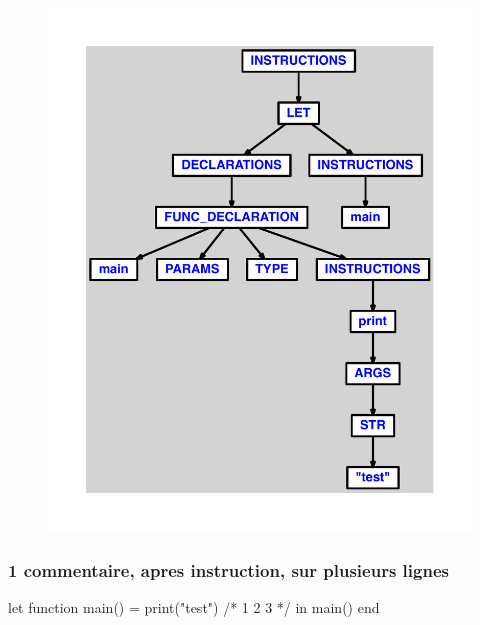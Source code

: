 \documentclass{article}
\begin{document}
\begin{figure}[H]\centering\includegraphics[max width=\textwidth]{ast/ast_152.pdf}\end{figure}\subsubsection{1 commentaire, apres instruction, sur plusieurs lignes}
\begin{verbatimtab}
let
	function main() = print("test")
	/*
	1
	2
	3
	*/
in main() end
\end{verbatimtab}
\end{document}
